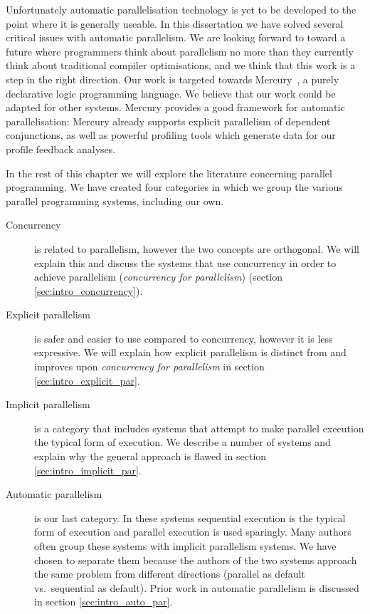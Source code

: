 Unfortunately automatic parallelisation technology is yet to be developed to the
point where it is generally useable.
In this dissertation we have solved several critical issues with automatic
parallelism.
We are looking forward to toward a future where programmers think about
parallelism no more than they currently think about traditional compiler
optimisations,
and we think that this work is a step in the right direction.
Our work is targeted towards Mercury~\cite{mercury},
a purely declarative logic programming language.
We believe that our work could be adapted for other systems.
Mercury provides a good framework for automatic parallelisation:
Mercury already supports explicit parallelism of dependent conjunctions,
as well as powerful profiling tools which generate data for our profile
feedback analyses.

In the rest of this chapter we will explore the literature concerning
parallel programming.
We have created four categories in which we group the various parallel
programming systems, including our own.

\begin{description}
    \item[Concurrency] is related to parallelism, however the two concepts
    are orthogonal.
    We will explain this and discuss the systems that use concurrency in
    order to achieve parallelism (\emph{concurrency for parallelism})
    (section \ref{sec:intro_concurrency}).

    \item[Explicit parallelism] is safer and easier to use compared to
    concurrency, however it is less expressive.
    We will explain how explicit parallelism is distinct from and improves
    upon \emph{concurrency for parallelism} in section
    \ref{sec:intro_explicit_par}.

    \item[Implicit parallelism] is a category that includes 
    systems that attempt to make parallel execution the typical form of
    execution.
    We describe a number of systems and explain why the general approach is
    flawed in section \ref{sec:intro_implicit_par}.

    \item[Automatic parallelism] is our last category.
    In these systems sequential execution is the typical form of execution
    and parallel execution is used sparingly.
    Many authors often group these systems with implicit parallelism systems.
    We have chosen to separate them because the authors of the two systems
    approach the same problem from different directions
    (parallel as default vs.\ sequential as default).
    Prior work in automatic parallelism is discussed in section
    \ref{sec:intro_auto_par}.
\end{description}    

